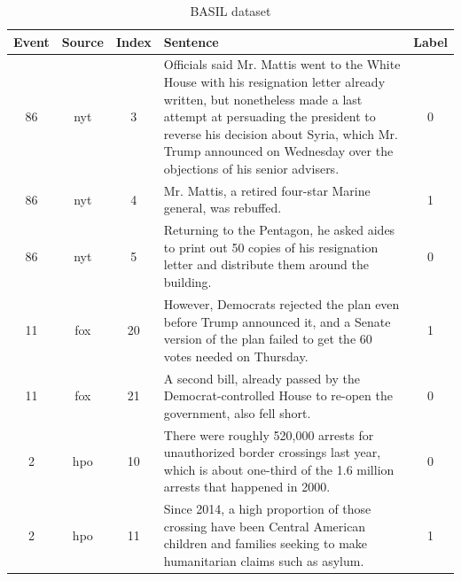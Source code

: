 \documentclass[letterpaper]{article} %
\begin{document}
\begin{table}[th]
    \centering
	\scriptsize
    \begin{tabular}{cccp{12cm}c}
        \toprule[2pt]
        \textbf{Event} & \textbf{Source} & \textbf{Index} & \textbf{Sentence} & \textbf{Label} \\
        \midrule[1pt]
        86 & nyt & 3 &  Officials said Mr. Mattis went to the White House with his resignation letter already written, but nonetheless made a last attempt at persuading the president to reverse his decision about Syria, which Mr. Trump announced on Wednesday over the objections of his senior advisers. & 0\\
        \hline
        86 & nyt & 4 &  Mr. Mattis, a retired four-star Marine general, was rebuffed. & 1\\
        \hline
        86 & nyt & 5 &  Returning to the Pentagon, he asked aides to print out 50 copies of his resignation letter and distribute them around the building. & 0 \\
        \midrule
        11 & fox & 20 & However, Democrats rejected the plan even before Trump announced it, and a Senate version of the plan failed to get the 60 votes needed on Thursday.  & 1\\
\hline
        11 & fox & 21 & A second bill, already passed by the Democrat-controlled House to re-open the government, also fell short. & 0\\
        \midrule
        2 & hpo & 10 & There were roughly 520,000 arrests for unauthorized border crossings last year, which is about one-third of the 1.6 million arrests that happened in 2000. & 0\\
        \hline
        2 & hpo & 11 &Since 2014, a high proportion of those crossing have been Central American children and families seeking to make humanitarian claims such as asylum. & 1\\
        \bottomrule[2pt]
    \end{tabular}
    \caption{BASIL dataset}
    \label{tab:basil}
\end{table}
\end{document}
